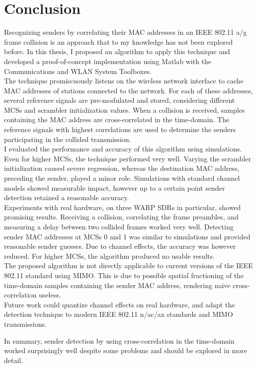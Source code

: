 
\chapter{Conclusion}\label{ch:Conclusion}
\glsresetall %

Recognizing senders by correlating their \gls{MAC} addresses in an IEEE 802.11 a/g frame collision is an approach that to my knowledge has not been explored before. In this thesis, I proposed an algorithm to apply this technique and developed a proof-of-concept implementation using Matlab with the Communications and WLAN System Toolboxes.\\

The technique promiscuously listens on the wireless network interface to cache \gls{MAC} addresses of stations connected to the network. For each of these addresses, several reference signals are pre-modulated and stored, considering different \glspl{MCS} and scrambler initialization values. When a collision is received, samples containing the \gls{MAC} address are cross-correlated in the time-domain. The reference signals with highest correlations are used to determine the senders participating in the collided transmission.\\

I evaluated the performance and accuracy of this algorithm using simulations. Even for higher \glspl{MCS}, the technique performed very well. Varying the scrambler initialization caused severe regression, whereas the destination \gls{MAC} address, preceding the sender, played a minor role. Simulations with standard channel models showed measurable impact, however up to a certain point sender detection retained a reasonable accuracy.\\

Experiments with real hardware, on three \gls{WARP} \glspl{SDR} in particular, showed promising results. Receiving a collision, correlating the frame preambles, and measuring a delay between two collided frames worked very well. Detecting sender \gls{MAC} addresses at \glspl{MCS} 0 and 1 was similar to simulations and provided reasonable sender guesses. Due to channel effects, the accuracy was however reduced. For higher \glspl{MCS}, the algorithm produced no usable results.\\

The proposed algorithm is not directly applicable to current versions of the IEEE 802.11 standard using \gls{MIMO}. This is due to possible spatial fractioning of the time-domain samples containing the sender \gls{MAC} address, rendering naive cross-correlation useless.\\

Future work could quantize channel effects on real hardware, and adapt the detection technique to modern IEEE 802.11 n/ac/ax standards and \gls{MIMO} transmissions.

In summary, sender detection by using cross-correlation in the time-domain worked surprisingly well despite some problems and should be explored in more detail.
